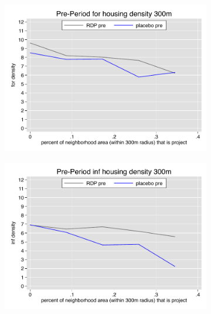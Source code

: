\documentclass[12pt]{article}
\begin{document}
\begin{figure}
        \begin{subfigure}[b]{0.495\textwidth}
            \centering
            \includegraphics[width=\textwidth,trim={0.3cm .3cm 0.1cm 0cm}, clip=true]{figures/overlap_for_300_total_pre.pdf}
        \end{subfigure}
        \hfill
        \begin{subfigure}[b]{0.495\textwidth}  
            \centering 
            \includegraphics[width=\textwidth,trim={0.3cm .3cm 0.1cm 0cm}, clip=true]{figures/overlap_inf_300_total_pre.pdf}
        \end{subfigure}
        \vspace{-6mm}

\end{figure}
\end{document}
